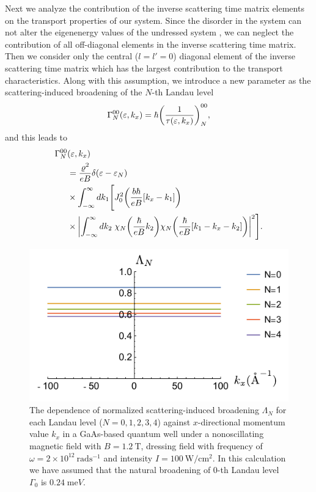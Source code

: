 Next we analyze the contribution of the inverse scattering time matrix elements on the transport properties of our system.
Since the disorder in the system can not alter the eigenenergy values of the undressed system \cite{wackerl20}, we can neglect the contribution of all off-diagonal elements in the inverse scattering time matrix. Then we consider only the central (${l=l'=0}$) diagonal element of the inverse scattering time matrix which has the largest contribution to the transport characteristics. Along with this assumption, we introduce a new parameter as the scattering-induced broadening of the $N$-th Landau level \cite{dini16,endo09}
\begin{equation} \label{eq_14}
 \Gamma^{00}_{N}(\varepsilon,k_x) = \hbar \qty(\frac{1}{\tau(\varepsilon,k_x)})^{00}_{N},
\end{equation}
and this leads to
\begin{equation} \label{eq_15}
 \begin{aligned}
   \Gamma^{00}_{N}& (\varepsilon,k_x) \\
   & =
   \frac { \varrho^2}{eB}
   \delta(\varepsilon - \varepsilon_{N}) \\
   & \times
   \int_{-\infty}^{\infty} d k_1 \Bigg[
   J_0^2\qty(\frac{b\hbar}{eB}[{k}_x - k_1])
   \\
   & \times
   \qty|
   \int_{-\infty}^{\infty} dk_2 \;
   {\chi}_{N}\qty(\frac{\hbar}{eB}k_2)
   {\chi}_{N}\qty(\frac{\hbar}{eB} \qty[k_1 - {k}_x - k_2])|^2\Bigg].
 \end{aligned}
\end{equation}

\begin{figure}[t]
\includegraphics[scale=0.68]{figures/fig_3}
\caption{\label{fig_3} The dependence of normalized scattering-induced broadening $\Lambda_N$ for each Landau level ($N =0,1,2,3,4$) against $x$-directional momentum value $k_x$ in a GaAs-based quantum well under a nonoscillating magnetic field with $B = 1.2~\text{T}$, dressing field with frequency of $\omega =2\times10^{12}~\text{rad}\text{s}^{-1}$ and intensity $I =100~\text{W}/\text{cm}^{2}$.
In this calculation we have assumed that the natural  broadening of $0$-th Landau level $\Gamma_0$ is $0.24\;\text{me}V$.}
\end{figure}


